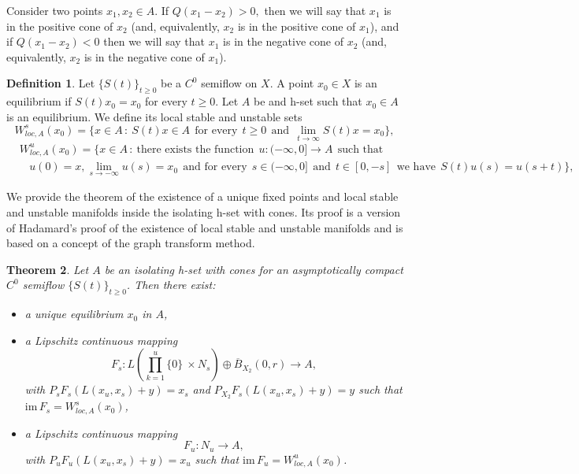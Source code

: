 \documentclass[11pt, leqno]{amsart}
\newtheorem{thm}{Theorem}[section]
\theoremstyle{definition}
\newtheorem{df}[thm]{Definition}
\begin{document}
Consider two points $x_1, x_2\in A$. If
$
Q(x_1-x_2) > 0,
$
then we will say that $x_1$ is in the positive cone of $x_2$ (and, equivalently, $x_2$ is in the positive cone of $x_1$), and if
$Q(x_1-x_2) < 0$
then we will say that $x_1$ is in the negative cone of $x_2$ (and, equivalently, $x_2$ is in the negative cone of $x_1$).
\begin{df}
	Let $\{ S(t) \}_{t\geq 0}$ be a $C^0$ semiflow on $X$. A point $x_0 \in X$ is an equilibrium if $S(t)x_0 = x_0$ for every $t\geq 0$. Let $A$ be and h-set such that $x_0\in A$ is an equilibrium.
	We define its local stable and unstable sets
	$$
	W^s_{loc,A}(x_0) = \{ x\in A\,:\ S(t)x\in A\ \ \textrm{for every}\ \ t\geq 0\ \ \textrm{and}\ \ \lim_{t\to \infty} S(t) x = x_0\},
	$$
	\begin{align*}
		& W^u_{loc,A}(x_0) = \{ x\in A\,:\ \textrm{there exists the function}\ \ u:(-\infty,0]\to A\ \ \textrm{such that} \\
		& \ \ \ \  u(0) = x, \lim_{s\to -\infty}u(s) = x_0\ \ \textrm{and for every}\ \  s\in (-\infty,0]\ \ \textrm{and}\ \ t\in [0,-s] \ \ \textrm{we have}\ \ S(t)u(s) = u(s+t)\},
	\end{align*}
\end{df}
We provide the theorem of the existence of a unique fixed points and local stable and unstable manifolds inside the isolating h-set with cones. Its proof is a version of Hadamard's proof of the existence of local stable and unstable manifolds and is based on a concept of the graph transform method.
\begin{thm}\label{graph_t}
	Let $A$ be an isolating h-set with cones for an asymptotically compact $C^0$ semiflow $\{ S(t) \}_{t\geq 0}$. Then there exist:
	\begin{itemize}
		\item a unique equilibrium $x_0$ in $A$,
		\item a Lipschitz continuous mapping
		$$
		F_s:L \left( \prod_{k=1}^{u} \{ 0 \}\ \times N_s\right) \oplus \overline{B}_{X_2}(0,r) \to A,
		$$
		with $P_s F_s(L(x_u,x_s)+y) = x_s$ and $P_{X_2} F_s(L(x_u,x_s)+y) = y$ such that $\textrm{im}\, F_s =  W^s_{loc,A}(x_0)$,
		\item a Lipschitz continuous mapping
		$$
		F_u:N_u \to A,
		$$
		with $P_u F_u(L(x_u,x_s)+y) = x_u$ such that $\textrm{im}\, F_u =  W^u_{loc,A}(x_0)$.
	\end{itemize}
\end{thm}
\end{document}
